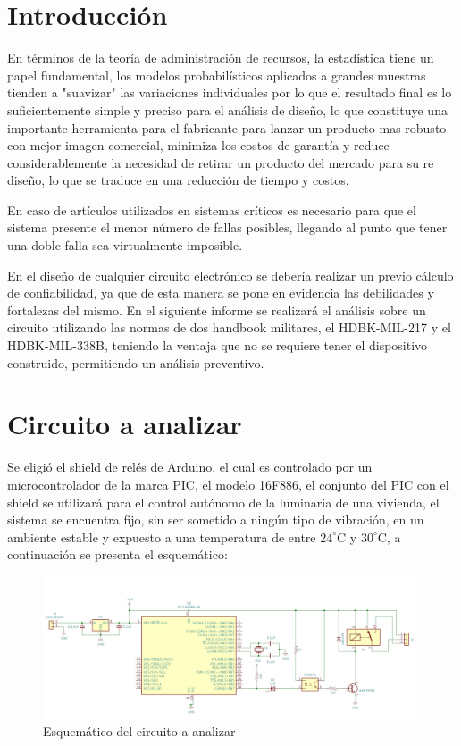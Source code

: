 \documentclass{article}
\begin{document}
\tableofcontents
\clearpage


\section{Introducción}
En términos de la teoría de administración de recursos, la estadística tiene un papel fundamental, los modelos probabilísticos aplicados a grandes muestras tienden a "suavizar" las variaciones individuales por lo que el resultado final es lo suficientemente simple y preciso para el análisis de diseño, lo que constituye una importante herramienta para el fabricante para lanzar un producto mas robusto con mejor imagen comercial, minimiza los costos de garantía y reduce considerablemente la necesidad de retirar un producto del mercado para su re diseño, lo que se traduce en una reducción de tiempo y costos.

En caso de artículos utilizados en sistemas críticos es necesario para que el sistema presente el menor número de fallas posibles, llegando al punto que tener una doble falla sea virtualmente imposible.

En el diseño de cualquier circuito electrónico se debería realizar un previo cálculo de confiabilidad, ya que de esta manera se pone en evidencia las debilidades y fortalezas del mismo. En el siguiente informe se realizará el análisis sobre un circuito utilizando las normas de dos handbook militares, el  HDBK-MIL-217 y el HDBK-MIL-338B, teniendo la ventaja que no se requiere tener el dispositivo construido, permitiendo un análisis preventivo.

\section{Circuito a analizar}
Se eligió el shield de relés de Arduino, el cual es controlado por un microcontrolador de la marca PIC, el modelo 16F886, el conjunto del PIC con el shield se utilizará para el control autónomo de la luminaria de una vivienda, el sistema se encuentra fijo, sin ser sometido a ningún tipo de vibración, en un ambiente estable y expuesto a una temperatura de entre $24^{\circ}$C y $30^{\circ}$C, a continuación se presenta el esquemático:
\begin{figure}[h]
 \begin{center}
	\includegraphics[width=\textwidth]{imagenes/fig1.jpg} 
	\caption{Esquemático del circuito a analizar}\label{fig:fig1}
 \end{center}
\end{figure}
%
\end{document}
